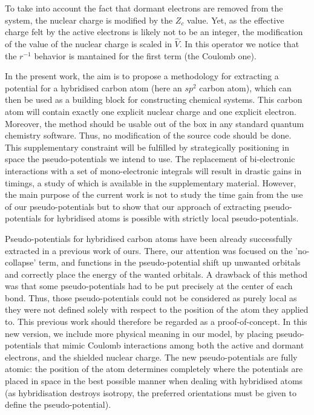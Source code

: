 \documentclass[aip,reprint]{revtex4-1}
\begin{document}
To take into account the fact that dormant electrons are removed from the
system, the nuclear charge is modified by the $Z_c$ value.
Yet, as the effective charge felt by the active electrons is likely not to be an integer,
the modification of the value of the nuclear charge is scaled in $\hat{V}$.
In this operator we notice that the \(r^{-1}\) behavior is mantained for the first term 
(the Coulomb one).

In the present work, the aim is 
to propose a methodology for extracting a potential for
a hybridised carbon atom (here an $sp^2$ carbon atom), which can then be
used as a building block for constructing chemical systems. This carbon atom
will contain exactly one explicit nuclear charge and one explicit electron.
Moreover, the method should be usable 
out of the box in any standard quantum chemistry software.
Thus, no modification of the source code should be done.
This supplementary constraint will be fulfilled by strategically positioning in space the pseudo-potentials
we intend to use. 
The replacement of bi-electronic interactions with a set of mono-electronic integrals
will result in drastic gains in timings, a study of which is available in the supplementary material.
However, the main purpose of the current work is not to study the time gain from the use of our pseudo-potentials but to show that our approach of extracting pseudo-potentials
for hybridised atoms is possible with strictly local pseudo-potentials.

Pseudo-potentials for hybridised carbon
atoms have been already successfully extracted in a previous work of ours.\cite{drujon_pseudopotentials_2013}
There, our attention was focused on the 'no-collapse' term, and 
functions in the pseudo-potential shift up unwanted orbitals and correctly place the energy of the
wanted orbitals.
A drawback of this method was that some pseudo-potentials had to be put precisely at the center
of each bond.
Thus, those pseudo-potentials could not be considered as purely local as they were not defined solely
with respect to the position of the atom they applied to.
This previous work should therefore be regarded as a proof-of-concept.
In this new version, we include more physical meaning in our model, 
by placing pseudo-potentials that mimic Coulomb interactions among both the active and dormant electrons, and the shielded nuclear charge. 
The new pseudo-potentials are fully atomic: the position of the atom
determines completely where the potentials are placed in space in the best possible manner
when dealing with hybridised atoms (as hybridisation destroys isotropy, the preferred orientations
must be given to define the pseudo-potential).
\end{document}
